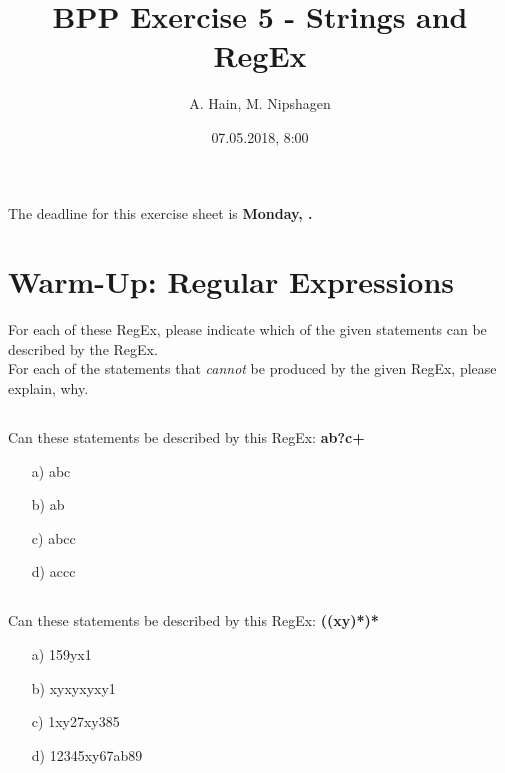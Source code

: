 


\title{BPP Exercise 5 - Strings and RegEx}
\author{A. Hain, M. Nipshagen}
\date{07.05.2018, 8:00}

\makeatletter
\let\thetitle\@title
\let\theauthor\@author
\let\thedate\@date
\makeatother

\newcommand\lpb{\small{<}}
\newcommand\rpb{\small{>}}
\newcommand\SubPoint[1]{
  \begin{itemize}
    \item #1
  \end{itemize}
  }





The deadline for this exercise sheet is \textbf{Monday, \thedate.}
%
%

\section{Warm-Up: Regular Expressions}
For each of these RegEx, please indicate which of the given statements can be described by the RegEx.\\
For each of the statements that \textit{cannot} be produced by the given RegEx, please explain, why.

\subsection{}
Can these statements be described by this RegEx: \textbf{ab?c+}
\begin{itemize}
\item[a)] abc 
\item[b)] ab 
\item[c)] abcc 
\item[d)] accc 
\end{itemize}

\subsection{}
Can these statements be described by this RegEx: \textbf{((xy)\textbar[0-9]*)*}
\begin{itemize}
\item[a)] 159yx1 
\item[b)] xyxyxyxy1 
\item[c)] 1xy27xy385 
\item[d)] 12345xy67ab89 
\end{itemize}

